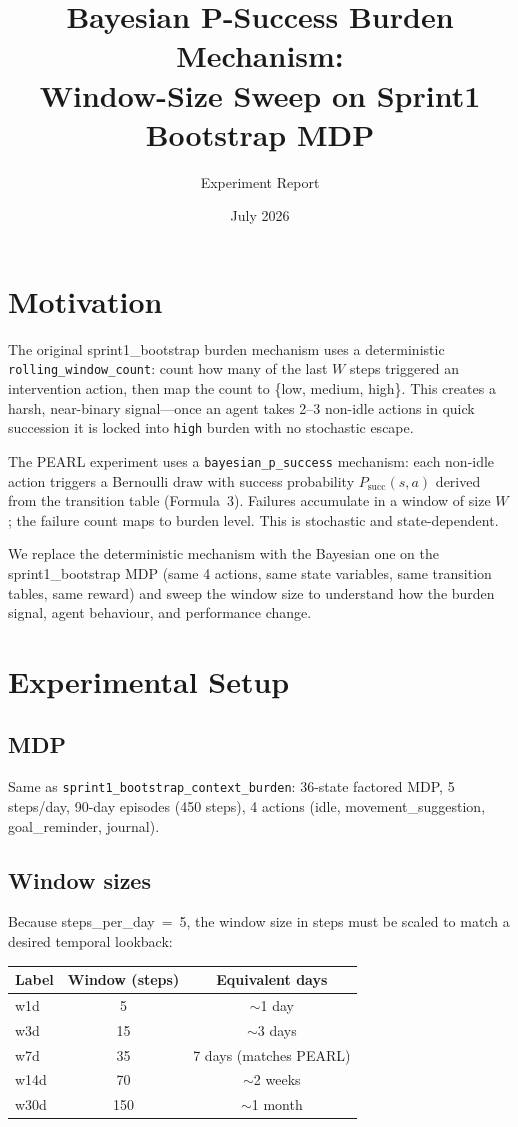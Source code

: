 \documentclass[11pt,a4paper]{article}
\title{Bayesian P-Success Burden Mechanism: \\
       Window-Size Sweep on Sprint1 Bootstrap MDP}
\author{Experiment Report}
\date{July 2026}
\begin{document}
\maketitle

\section{Motivation}

The original sprint1\_bootstrap burden mechanism uses a deterministic
\texttt{rolling\_window\_count}: count how many of the last $W$ steps
triggered an intervention action, then map the count to
\{low, medium, high\}.  This creates a harsh, near-binary signal---once
an agent takes 2--3 non-idle actions in quick succession it is locked
into \texttt{high} burden with no stochastic escape.

The PEARL experiment uses a \texttt{bayesian\_p\_success} mechanism:
each non-idle action triggers a Bernoulli draw with success probability
$P_{\text{succ}}(s,a)$ derived from the transition table (Formula~3).
Failures accumulate in a window of size $W$; the failure count maps to
burden level.  This is stochastic and state-dependent.

We replace the deterministic mechanism with the Bayesian one on the
sprint1\_bootstrap MDP (same 4 actions, same state variables, same
transition tables, same reward) and sweep the window size to understand
how the burden signal, agent behaviour, and performance change.

\section{Experimental Setup}

\subsection{MDP}
Same as \texttt{sprint1\_bootstrap\_context\_burden}: 36-state factored
MDP, 5 steps/day, 90-day episodes (450 steps), 4 actions (idle,
movement\_suggestion, goal\_reminder, journal).

\subsection{Window sizes}
Because steps\_per\_day~=~5, the window size in steps must be scaled
to match a desired temporal lookback:

\begin{center}
\begin{tabular}{lcc}
\toprule
Label & Window (steps) & Equivalent days \\
\midrule
w1d  & 5   & $\sim$1 day \\
w3d  & 15  & $\sim$3 days \\
w7d  & 35  & 7 days (matches PEARL) \\
w14d & 70  & $\sim$2 weeks \\
w30d & 150 & $\sim$1 month \\
\bottomrule
\end{tabular}
\end{center}
\end{document}
